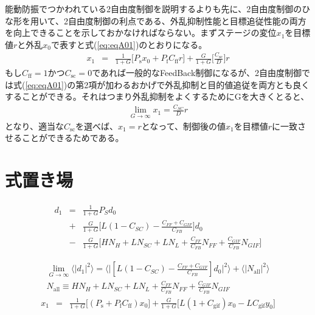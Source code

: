 \documentclass[a4paper,12pt]{jsarticle}
\begin{document}
能動防振でつかわれている2自由度制御を説明するよりも先に、2自由度制御のひな形を用いて、2自由度制御の利点である、外乱抑制性能と目標追従性能の両方を向上できることを示しておかなければならない。まずステージの変位$x_1$を目標値$r$と外乱$x_0$で表すと式(\ref{eq:eqA01})のとおりになる。
\begin{eqnarray} \label{eq:eqA01}
  x_1 &=& \frac{1}{1+G}\Biggl[P_{\mathrm{s}}x_0 + P_{\mathrm{f}}C_{\mathrm{ff}}r\Biggl] + \frac{G}{1+G}\Biggl[\frac{C_{\mathrm{sc}}}{D}\Biggl]r
\end{eqnarray}
もし$C_{\mathrm{ff}}=1$かつ$C_{\mathrm{sc}}=0$であれば一般的なFeedBack制御になるが、2自由度制御では式(\ref{eq:eqA01})の第2項が加わるおかげで外乱抑制と目的値追従を両方とも良くすることができる。それはつまり外乱抑制をよくするためにGを大きくとると、
\begin{eqnarray} \label{eq:eqA02}
  \lim_{G \to \infty} x_1 = \frac{C_{SC}}{D}r
\end{eqnarray}
となり、適当な$C_{\mathrm{sc}}$を選べば、$x_{1}=r$となって、制御後の値$x_{1}$を目標値$r$に一致させることができるためである。

\section{式置き場}

\begin{eqnarray}
  d_1 &=& \frac{1}{1+G}P_{S}d_0 \\
  &+& \frac{G}{1+G}\Biggl[L(1-C_{SC})-\frac{C_{FF}+C_{GIF}}{C_{FB}}\Biggl]d_0 \nonumber \\
  &-& \frac{G}{1+G}\Biggl[HN_{H} + LN_{SC} + LN_{L} + \frac{C_{FF}}{C_{FB}}N_{FF} + \frac{C_{GIF}}{C_{FB}}N_{GIF} \Biggl] \nonumber
\end{eqnarray}

\begin{eqnarray}
  \lim_{G \to \infty} \langle|d_1|^2\rangle =
  \biggl\langle\biggl|[L(1-C_{SC})-\frac{C_{FF}+C_{GIF}}{C_{FB}}]d_0\biggl|^2\biggl\rangle + \langle|N_{\mathrm{all}}|^2 \rangle \\
N_{\mathrm{all}} \equiv HN_{H} + LN_{SC} + LN_{L} + \frac{C_{FF}}{C_{FB}}N_{FF} + \frac{C_{GIF}}{C_{FB}}N_{GIF} \nonumber
\end{eqnarray}
%
%
\begin{eqnarray}
  x_1 &=& \frac{1}{1+G}\Biggl[(P_{\mathrm{s}}+P_{\mathrm{f}}C_{\mathrm{ff}})x_0\Biggl]
  + \frac{G}{1+G}\Biggl[L(1+C_{\mathrm{gif}})x_0 - LC_{\mathrm{gif}}y_0\Biggl]
\end{eqnarray}



\end{document}
